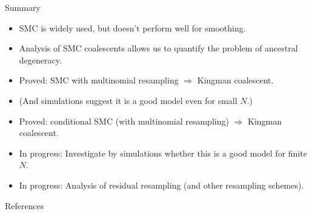 \documentclass[aspectratio=169]{beamer}
\theoremstyle{definition}
\begin{document}
\begin{frame}{Summary}
\begin{itemize}
\item SMC is widely used, but doesn't perform well for smoothing.
\pause
\item Analysis of SMC coalescents allows us to quantify the problem of ancestral degeneracy.
\pause
\item Proved: SMC with multinomial resampling $\Rightarrow$ Kingman coalescent.
\item (And simulations suggest it is a good model even for small $N$.)
\pause
\item Proved: conditional SMC (with multinomial resampling) $\Rightarrow$ Kingman coalescent.
\item In progress: Investigate by simulations whether this is a good model for finite $N$.
\pause
\item In progress: Analysis of residual resampling (and other resampling schemes).
\end{itemize}
\end{frame}

\begin{frame}[allowframebreaks]{References}

{\small 

}
\end{frame}
\end{document}
